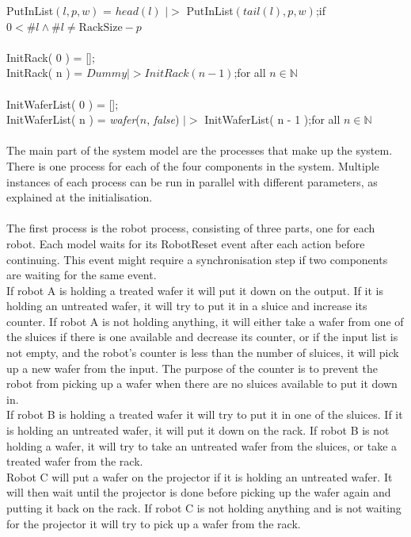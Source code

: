 \documentclass[12pt]{report}
\newcounter{counter}
\begin{document}
	\phantom{----} PutInList$( l, p, w )$ = $ head( l )$ $|>$ PutInList$( tail( l ), p, w )$;\hfill if $0 < \#l \land \#l \neq \text{RackSize} - p$\\
	\\
	\phantom{----} InitRack( 0 ) = [];\\
	\phantom{----} InitRack( n ) = $Dummy |> InitRack( n - 1 )$;\hfill for all $n \in \mathbb{N}$\\
	\\
	\phantom{----} InitWaferList( 0 ) = [];\\
	\phantom{----} InitWaferList( n ) = \emph{wafer}($n$, \emph{false}) $|>$ InitWaferList( n - 1 );\hfill for all $n \in \mathbb{N}$\\
	\\
	The main part of the system model are the processes that make up the system. There is one process for each of the four components in the system. Multiple instances of each process can be run in parallel with different parameters, as explained at the initialisation.\\
	\\%
	The first process is the robot process, consisting of three parts, one for each robot. Each model waits for its RobotReset event after each action before continuing. This event might require a synchronisation step if two components are waiting for the same event.\\
	If robot A is holding a treated wafer it will put it down on the output. If it is holding an untreated wafer, it will try to put it in a sluice and increase its counter. If robot A is not holding anything, it will either take a wafer from one of the sluices if there is one available and decrease its counter, or if the input list is not empty, and the robot's counter is less than the number of sluices, it will pick up a new wafer from the input. The purpose of the counter is to prevent the robot from picking up a wafer when there are no sluices available to put it down in.\\
	If robot B is holding a treated wafer it will try to put it in one of the sluices. If it is holding an untreated wafer, it will put it down on the rack. If robot B is not holding a wafer, it will try to take an untreated wafer from the sluices, or take a treated wafer from the rack.\\
	Robot C will put a wafer on the projector if it is holding an untreated wafer. It will then wait until the projector is done before picking up the wafer again and putting it back on the rack. If robot C is not holding anything and is not waiting for the projector it will try to pick up a wafer from the rack.\\
\end{document}
